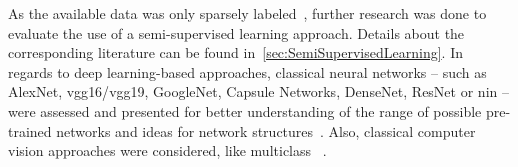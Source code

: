 \bigbreak
As the available data was only sparsely labeled~\citep{olivier2006semi,zhu05survey}, further research was done to evaluate the use of a semi-supervised learning approach. Details about the corresponding literature can be found in~\autoref{sec:SemiSupervisedLearning}. In regards to deep learning-based approaches, classical neural networks -- such as AlexNet, \acrshort{vgg}16/\acrshort{vgg}19, GoogleNet, Capsule Networks,  DenseNet, ResNet or \acrfull{nin} -- were assessed and presented for better understanding of the range of possible pre-trained networks and ideas for network structures~\citep{alexnet2012original,vgg2014original,googlenet2015original,capsulenet2017original,densenet2017original,resnet2016original,lin2013network}. Also, classical computer vision approaches were considered, like multiclass ~\citep{prakash2012multi}.

